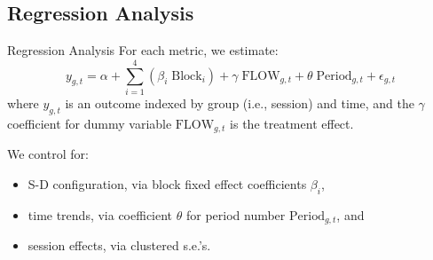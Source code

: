 \documentclass[10pt]{beamer}
\begin{document}
\subsection{Regression Analysis}



\begin{frame}{Regression Analysis}
For each metric, we estimate: 
\begin{equation} \label{eq:reg}
    y_{g,t} = \alpha + \sum^{4}_{i = 1} \left(\beta_i \; \text{Block}_i\right) + \gamma \; \text{FLOW}_{g,t} + \theta \; \text{Period}_{g,t} + \epsilon_{g,t}
\end{equation}
where $y_{g,t}$ is an outcome  indexed by group (i.e., session) and time, and the $\gamma$ coefficient for dummy variable $\text{FLOW}_{g,t}$ is the treatment effect. %

We control for: 
\begin{itemize}
\item S-D configuration, via  block fixed effect coefficients $\beta_i$,  
\item time trends, via coefficient $\theta$ for period number $\text{Period}_{g,t}$, and
\item session effects, via clustered s.e.'s.
\end{itemize} %
 
\end{frame}
\end{document}
